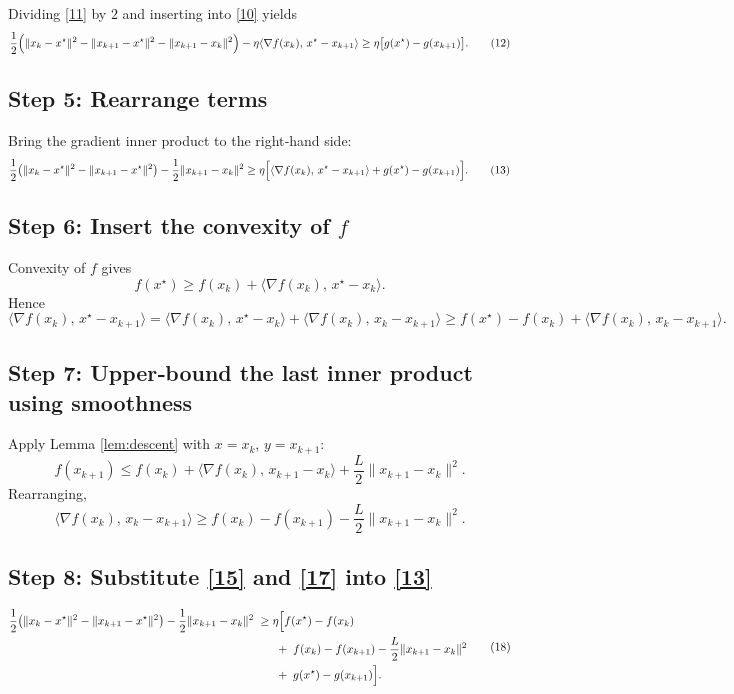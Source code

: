 \documentclass{article}
\newcommand{\grad}{\nabla}
\begin{document}
Dividing \eqref{11} by $2$ and inserting into \eqref{10} yields
\[
\frac{1}{2}\Bigl(\|x_k-x^\star\|^{2}-\|x_{k+1}-x^\star\|^{2}-\|x_{k+1}-x_k\|^{2}\Bigr)
-\eta\langle\grad f(x_k),\,x^\star-x_{k+1}\rangle
\ge \eta\bigl[g(x^\star)-g(x_{k+1})\bigr].
\tag{12}
\]

\subsection*{Step 5: Rearrange terms}
Bring the gradient inner product to the right‑hand side:
\[
\frac{1}{2}\bigl(\|x_k-x^\star\|^{2}-\|x_{k+1}-x^\star\|^{2}\bigr)
-\frac{1}{2}\|x_{k+1}-x_k\|^{2}
\ge \eta\Bigl[\langle\grad f(x_k),\,x^\star-x_{k+1}\rangle
+g(x^\star)-g(x_{k+1})\Bigr].
\tag{13}
\]

\subsection*{Step 6: Insert the convexity of $f$}
Convexity of $f$ gives
\[
f(x^\star)\ge f(x_k)+\langle\grad f(x_k),\,x^\star-x_k\rangle.
\tag{14}
\]
Hence
\[
\langle\grad f(x_k),\,x^\star-x_{k+1}\rangle
= \langle\grad f(x_k),\,x^\star-x_k\rangle
+ \langle\grad f(x_k),\,x_k-x_{k+1}\rangle
\ge f(x^\star)-f(x_k)+\langle\grad f(x_k),\,x_k-x_{k+1}\rangle.
\tag{15}
\]

\subsection*{Step 7: Upper‑bound the last inner product using smoothness}
Apply Lemma \ref{lem:descent} with $x=x_k$, $y=x_{k+1}$:
\[
f(x_{k+1})\le f(x_k)+\langle\grad f(x_k),\,x_{k+1}-x_k\rangle
+\frac{L}{2}\|x_{k+1}-x_k\|^{2}.
\tag{16}
\]
Rearranging,
\[
\langle\grad f(x_k),\,x_k-x_{k+1}\rangle
\ge f(x_k)-f(x_{k+1})-\frac{L}{2}\|x_{k+1}-x_k\|^{2}.
\tag{17}
\]

\subsection*{Step 8: Substitute \eqref{15} and \eqref{17} into \eqref{13}}
\[
\begin{aligned}
\frac{1}{2}\bigl(\|x_k-x^\star\|^{2}-\|x_{k+1}-x^\star\|^{2}\bigr)
-\frac{1}{2}\|x_{k+1}-x_k\|^{2}
\;\ge\;&\eta\Bigl[f(x^\star)-f(x_k)\\
&\;+\;f(x_k)-f(x_{k+1})-\frac{L}{2}\|x_{k+1}-x_k\|^{2}\\
&\;+\;g(x^\star)-g(x_{k+1})\Bigr].
\end{aligned}
\tag{18}
\]
\end{document}
